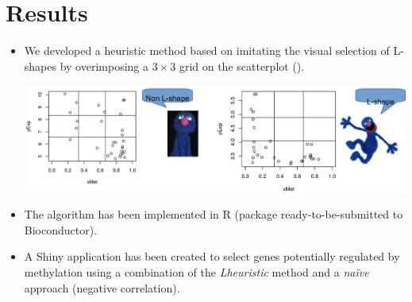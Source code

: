 \section{Results}
\begin{itemize}
	\item We developed a heuristic method based on imitating the visual selection of L-shapes by overimposing a $3\times 3$ grid on the scatterplot (\cite{sanchez:2019}).
	
	\begin{center}
		\includegraphics[width=\columnwidth]{./images/LshapeVsnonLshape.png}
	\end{center}
	
	\item The algorithm has been implemented in R (package ready-to-be-submitted to Bioconductor).
	\item A Shiny application has been created to select genes potentially regulated by methylation using a combination of the \textit{Lheuristic} method and a \textit{naïve} approach (negative correlation).	
\end{itemize}
